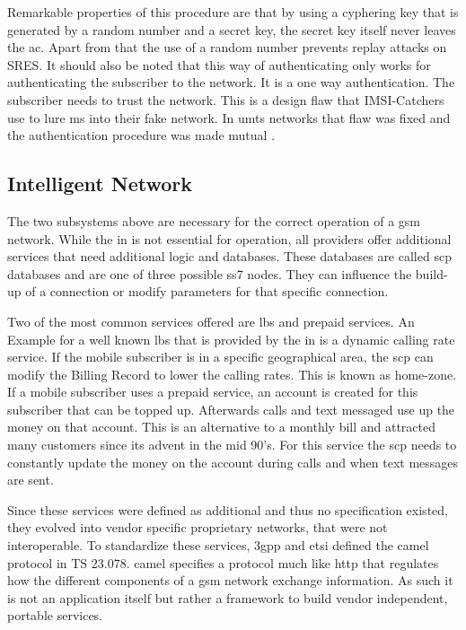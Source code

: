 Remarkable properties of this procedure are that by using a cyphering key that is generated by a random number and a secret key, the secret key itself never leaves the \gls{ac}.
Apart from that the use of a random number prevents replay attacks on SRES.
It should also be noted that this way of authenticating only works for authenticating the subscriber to the network.
It is a one way authentication.
The subscriber needs to trust the network.
This is a design flaw that IMSI-Catchers use to lure \gls{ms} into their fake network.
In \gls{umts} networks that flaw was fixed and the authentication procedure was made mutual \cite{kommsys2006}.

\subsection{Intelligent Network}
The two subsystems above are necessary for the correct operation of a \gls{gsm} network.
While the \gls{in} is not essential for operation, all providers offer additional services that need additional logic and databases.
These databases are called \gls{scp} databases and are one of three possible \gls{ss7} nodes.
They can influence the build-up of a connection or modify parameters for that specific connection.

Two of the most common services offered are \gls{lbs} and prepaid services.
An Example for a well known \gls{lbs} that is provided by the \gls{in} is a dynamic calling rate service.
If the mobile subscriber is in a specific geographical area, the \gls{scp} can modify the Billing Record to lower the calling rates.
This is known as home-zone.
If a mobile subscriber uses a prepaid service, an account is created for this subscriber that can be topped up.
Afterwards calls and text messaged use up the money on that account.
This is an alternative to a monthly bill and attracted many customers since its advent in the mid 90's.
For this service the \gls{scp} needs to constantly update the money on the account during calls and when text messages are sent.

Since these services were defined as additional and thus no specification existed, they evolved into vendor specific proprietary networks, that were not interoperable.
To standardize these services, \gls{3gpp} and \gls{etsi} defined the \gls{camel} protocol in TS 23.078\cite{GSM23078}.
\gls{camel} specifies a protocol much like \gls{http} that regulates how the different components of a \gls{gsm} network exchange information.
As such it is not an application itself but rather a framework to build vendor independent, portable services.


